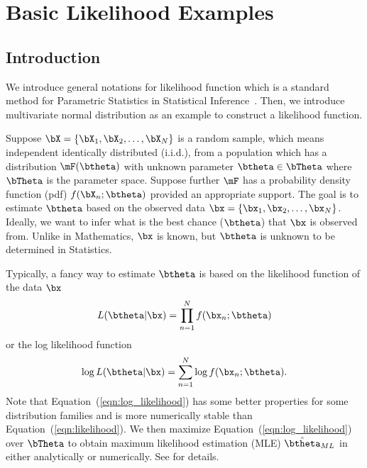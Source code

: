 
\chapter{Basic Likelihood Examples}
\label{chp:mle}


\section{Introduction}

We introduce general notations for likelihood function
which is a standard method for Parametric Statistics in
Statistical Inference~\citep{Casella2001}.
Then, we introduce multivariate normal
distribution
as an example to construct a likelihood function.

Suppose $\bX = \{\bX_1, \bX_2, \ldots, \bX_N\}$ is a random sample,
which means independent identically distributed
(i.i.d.),
from a population which has a distribution $\mF(\btheta)$ with unknown
parameter $\btheta \in \bTheta$ where $\bTheta$ is the parameter space.
Suppose further $\mF$ has a probability density function
(pdf)
$f(\bX_n; \btheta)$ provided an appropriate support.
The goal is to estimate $\btheta$ based on the observed data
$\bx = \{\bx_1, \bx_2, \ldots, \bx_N\}$.
Ideally, we want to infer what is the best chance ($\btheta$)
that $\bx$ is observed from.
Unlike in Mathematics, $\bx$ is known, but $\btheta$ is unknown
to be determined in Statistics.

Typically, a fancy way to estimate $\btheta$ is based on the
likelihood function of the data $\bx$
\begin{equation}
L(\btheta|\bx) = \prod_{n = 1}^N f(\bx_n; \btheta)
\label{eqn:likelihood}
\end{equation}
or the log likelihood function
\begin{equation}
\log L(\btheta|\bx) = \sum_{n = 1}^N \log f(\bx_n; \btheta).
\label{eqn:log_likelihood}
\end{equation}
Note that Equation~(\ref{eqn:log_likelihood}) has some
better properties for some distribution families and
is more numerically stable than Equation~(\ref{eqn:likelihood}).
We then maximize Equation~(\ref{eqn:log_likelihood})
over $\bTheta$ to obtain maximum likelihood estimation
(MLE) $\hat{\btheta}_{ML}$ in either analytically or numerically.
See \citet{Casella2001} for details.


